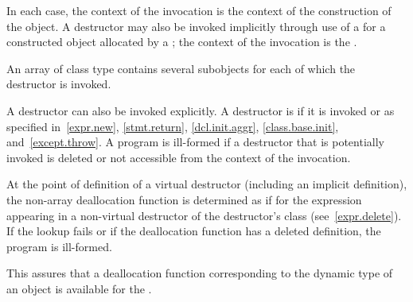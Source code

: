 %
%
In each case, the context of the invocation is the context of the construction of
the object. A destructor may also be invoked implicitly through use of a
 for a constructed object allocated
by a ; the context of the invocation is the
.
\begin{note}
An array of class type contains several subobjects for each of which
the destructor is invoked.
\end{note}
A destructor can also be invoked explicitly. A destructor is 
if it is invoked or as specified in~\ref{expr.new},
\ref{stmt.return}, \ref{dcl.init.aggr},
\ref{class.base.init}, and~\ref{except.throw}.
A program is ill-formed if a destructor that is potentially invoked is deleted
or not accessible from the context of the invocation.

\pnum
At the point of definition of a virtual destructor (including an implicit
definition), the non-array deallocation function is
determined as if for the expression  appearing in a
non-virtual destructor of the destructor's class (see~\ref{expr.delete}).
If the lookup fails or if the deallocation function has
a deleted definition, the program is ill-formed.
\begin{note}
This assures that a deallocation function corresponding to the dynamic type of an
object is available for the
.
\end{note}

